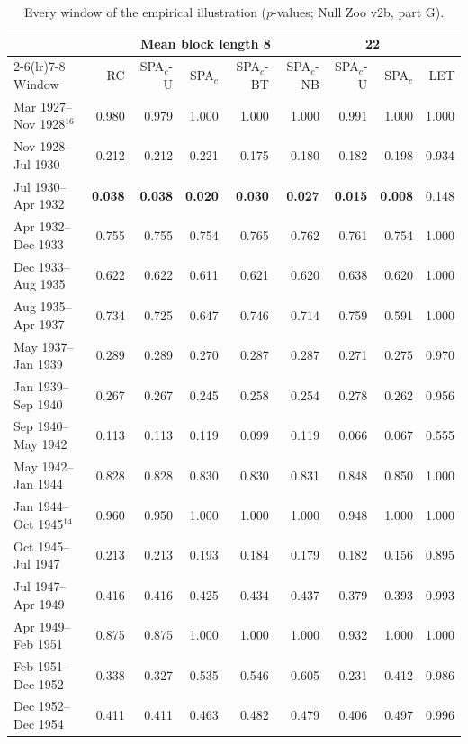 \begin{table}[p]
\centering
\scriptsize
\setlength{\tabcolsep}{3.5pt}
\caption{Every window of the empirical illustration ($p$-values; Null Zoo v2b, part G).}
\label{tab:empirical-all}
\begin{tabular}{lrrrrrrrr}
\toprule
 & \multicolumn{5}{c}{Mean block length 8} & \multicolumn{2}{c}{22} & \multicolumn{1}{c}{} \\
\cmidrule(lr){2-6}\cmidrule(lr){7-8}
Window & RC & SPA$_c$-U & SPA$_c$ & SPA$_c$-BT & SPA$_c$-NB & SPA$_c$-U & SPA$_c$ & LET \\
\midrule
Mar 1927--Nov 1928$^{16}$ & 0.980 & 0.979 & 1.000 & 1.000 & 1.000 & 0.991 & 1.000 & 1.000 \\
Nov 1928--Jul 1930 & 0.212 & 0.212 & 0.221 & 0.175 & 0.180 & 0.182 & 0.198 & 0.934 \\
Jul 1930--Apr 1932 & \textbf{0.038} & \textbf{0.038} & \textbf{0.020} & \textbf{0.030} & \textbf{0.027} & \textbf{0.015} & \textbf{0.008} & 0.148 \\
Apr 1932--Dec 1933 & 0.755 & 0.755 & 0.754 & 0.765 & 0.762 & 0.761 & 0.754 & 1.000 \\
Dec 1933--Aug 1935 & 0.622 & 0.622 & 0.611 & 0.621 & 0.620 & 0.638 & 0.620 & 1.000 \\
Aug 1935--Apr 1937 & 0.734 & 0.725 & 0.647 & 0.746 & 0.714 & 0.759 & 0.591 & 1.000 \\
May 1937--Jan 1939 & 0.289 & 0.289 & 0.270 & 0.287 & 0.287 & 0.271 & 0.275 & 0.970 \\
Jan 1939--Sep 1940 & 0.267 & 0.267 & 0.245 & 0.258 & 0.254 & 0.278 & 0.262 & 0.956 \\
Sep 1940--May 1942 & 0.113 & 0.113 & 0.119 & 0.099 & 0.119 & 0.066 & 0.067 & 0.555 \\
May 1942--Jan 1944 & 0.828 & 0.828 & 0.830 & 0.830 & 0.831 & 0.848 & 0.850 & 1.000 \\
Jan 1944--Oct 1945$^{14}$ & 0.960 & 0.950 & 1.000 & 1.000 & 1.000 & 0.948 & 1.000 & 1.000 \\
Oct 1945--Jul 1947 & 0.213 & 0.213 & 0.193 & 0.184 & 0.179 & 0.182 & 0.156 & 0.895 \\
Jul 1947--Apr 1949 & 0.416 & 0.416 & 0.425 & 0.434 & 0.437 & 0.379 & 0.393 & 0.993 \\
Apr 1949--Feb 1951 & 0.875 & 0.875 & 1.000 & 1.000 & 1.000 & 0.932 & 1.000 & 1.000 \\
Feb 1951--Dec 1952 & 0.338 & 0.327 & 0.535 & 0.546 & 0.605 & 0.231 & 0.412 & 0.986 \\
Dec 1952--Dec 1954 & 0.411 & 0.411 & 0.463 & 0.482 & 0.479 & 0.406 & 0.497 & 0.996 \\

\end{tabular}
\end{table}
